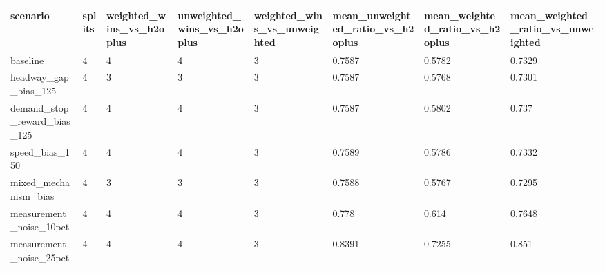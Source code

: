 \begin{tabular}{llllllll}
\toprule
scenario & splits & weighted\_wins\_vs\_h2oplus & unweighted\_wins\_vs\_h2oplus & weighted\_wins\_vs\_unweighted & mean\_unweighted\_ratio\_vs\_h2oplus & mean\_weighted\_ratio\_vs\_h2oplus & mean\_weighted\_ratio\_vs\_unweighted \\
\midrule
baseline & 4 & 4 & 4 & 3 & 0.7587 & 0.5782 & 0.7329 \\
headway\_gap\_bias\_125 & 4 & 3 & 3 & 3 & 0.7587 & 0.5768 & 0.7301 \\
demand\_stop\_reward\_bias\_125 & 4 & 4 & 4 & 3 & 0.7587 & 0.5802 & 0.737 \\
speed\_bias\_150 & 4 & 4 & 4 & 3 & 0.7589 & 0.5786 & 0.7332 \\
mixed\_mechanism\_bias & 4 & 3 & 3 & 3 & 0.7588 & 0.5767 & 0.7295 \\
measurement\_noise\_10pct & 4 & 4 & 4 & 3 & 0.778 & 0.614 & 0.7648 \\
measurement\_noise\_25pct & 4 & 4 & 4 & 3 & 0.8391 & 0.7255 & 0.851 \\
\bottomrule
\end{tabular}
